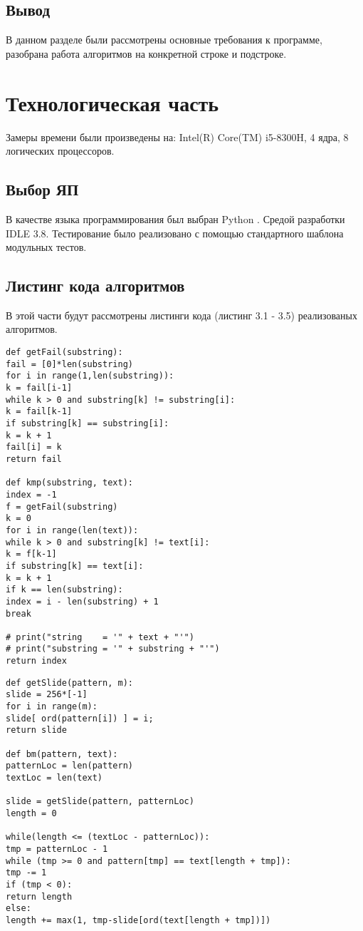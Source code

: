 \documentclass[12pt]{report}
\begin{document}
\section*{Вывод}
В данном разделе были рассмотрены основные требования к программе, разобрана работа алгоритмов на конкретной строке и подстроке.

 

\chapter{Технологическая часть}
Замеры времени были произведены на: Intel(R) Core(TM) i5-8300H, 4 ядра, 8 логических процессоров.

\section{Выбор ЯП}
В качестве языка программирования был выбран Python \cite{Microsoft}. Средой разработки IDLE 3.8. 
Тестирование было реализовано с помощью стандартного шаблона модульных тестов\cite{UnitTests}.

\section{Листинг кода алгоритмов}
В этой части будут рассмотрены листинги кода (листинг 3.1 - 3.5) реализованых алгоритмов.

\begin{lstlisting}[label=some-code,caption=Алгоритм KMP]
def getFail(substring):
fail = [0]*len(substring)
for i in range(1,len(substring)):
k = fail[i-1]
while k > 0 and substring[k] != substring[i]:
k = fail[k-1]
if substring[k] == substring[i]:
k = k + 1
fail[i] = k
return fail

def kmp(substring, text):
index = -1
f = getFail(substring)
k = 0
for i in range(len(text)):
while k > 0 and substring[k] != text[i]:
k = f[k-1]
if substring[k] == text[i]:
k = k + 1
if k == len(substring):
index = i - len(substring) + 1
break

# print("string    = '" + text + "'")
# print("substring = '" + substring + "'")
return index

\end{lstlisting}

\begin{lstlisting}[label=some-code,caption= Алгоритм Бойера-Мура]
def getSlide(pattern, m):
slide = 256*[-1]
for i in range(m):
slide[ ord(pattern[i]) ] = i;
return slide

def bm(pattern, text):
patternLoc = len(pattern)
textLoc = len(text)

slide = getSlide(pattern, patternLoc)
length = 0

while(length <= (textLoc - patternLoc)):
tmp = patternLoc - 1
while (tmp >= 0 and pattern[tmp] == text[length + tmp]):
tmp -= 1
if (tmp < 0):
return length
else:
length += max(1, tmp-slide[ord(text[length + tmp])])
\end{lstlisting}
\end{document}
